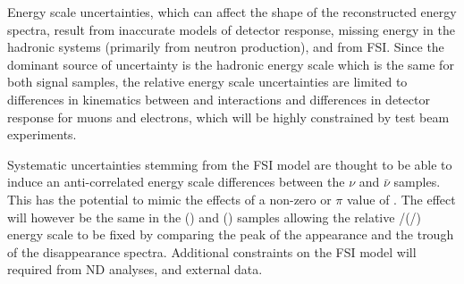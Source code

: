 
Energy scale uncertainties, which can affect the shape of the reconstructed energy spectra, result from
inaccurate models of detector response, missing energy in the hadronic systems (primarily from neutron production),
and from FSI. Since the dominant source of uncertainty is the hadronic energy scale which is the same for both
signal samples, the relative energy scale uncertainties are limited to differences in kinematics
between \numu and \nue interactions and differences in detector response for muons and electrons,
which will be highly constrained by test beam experiments.

Systematic uncertainties stemming from the FSI model are thought to be able to induce an anti-correlated 
energy scale differences between the $\nu$ and $\bar\nu$ samples. This has the potential to mimic the effects
of a non-zero or $\pi$ value of \deltacp. The effect will however be the same in the \nue (\anue) and \numu
(\anumu) samples allowing the relative \nue/\numu (\anue/\anumu) energy scale to be fixed by comparing
the peak of the appearance and the trough of the disappearance spectra. Additional constraints on the FSI 
model will required from ND analyses, and external data.


